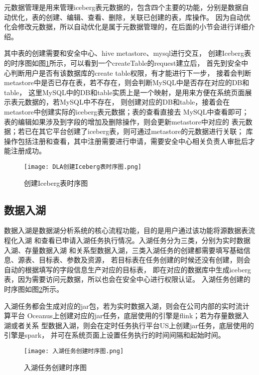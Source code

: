 元数据管理是用来管理iceberg表元数据的，包含四个主要的功能，分别是数据自动优化，表的创建、编辑、查看、删除，关联已创建的表，库操作。
因为自动优化会修改元数据，所以自动优化是属于元数据管理的，在后面的小节会进行详细介绍。

其中表的创建需要和安全中心、hive metastore、mysql进行交互，
创建Iceberg表的时序图如图\ref{fig:创建Iceberg表时序图}所示，可以看到一个createTable的request建立后，
首先到安全中心判断用户是否有该数据库的create table权限，有才能进行下一步，
接着会判断metastore中是否已存在表，若不存在，则会判断MySQL中是否存在对应的DB和table，
这里MySQL中的DB和table实质上是一个映射，是用来方便在系统页面展示表元数据的，若MySQL中不存在，
则创建对应的DB和table，接着会在metastore中创建实际的iceberg表元数据；表的查看直接去
MySQL中查看即可；表的编辑如果涉及到字段的增加及删除操作，则会更新metastore中对应的
表元数据；若已在其它平台创建了iceberg表，则可通过metastore的元数据进行关联；
库操作包括注册和查看，其中注册需要进行申请，需要安全中心相关负责人审批后才能注册成功。

\begin{figure}[H]
  \centering
  \texttt{[image: DLA创建Iceberg表时序图.png]}
  \caption{创建Iceberg表时序图}
  \label{fig:创建Iceberg表时序图}
\end{figure}

\subsection{数据入湖}

数据入湖是数据湖分析系统的核心流程功能，目的是用户通过该功能将源数据表流程化入湖
和查看已申请入湖任务执行情况。入湖任务分为三类，分别为实时数据入湖、存量数据入湖
和关系型数据入湖，三类入湖任务的创建都需要填写基础信息、源表、目标表、参数及资源，
若目标表在任务创建的时候还没有创建，则会自动的根据填写的字段信息生产对应的目标表，
即在对应的数据库中生成iceberg表，因为需要访问元数据，所以也会在安全中心进行权限认证。
入湖任务创建的时序图如图\ref{fig:入湖任务创建时序图}所示。

入湖任务都会生成对应的jar包，若为实时数据入湖，则会在公司内部的实时流计算平台
Oceanus上创建对应的jar任务，底层使用的引擎是flink；若为存量数据入湖或者关系
型数据入湖，则会在定时任务执行平台US上创建jar任务，底层使用的引擎是spark，
并可在系统页面上设置任务执行的时间间隔和起始时间。

\begin{figure}[H]
  \centering
  \texttt{[image: 入湖任务创建时序图.png]}
  \caption{入湖任务创建时序图}
  \label{fig:入湖任务创建时序图}
\end{figure}

